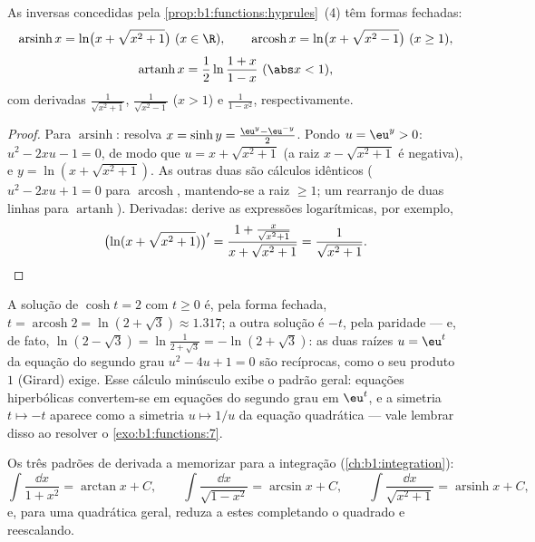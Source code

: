\begin{proposition}\label{prop:b1:functions:invhyp}
As inversas concedidas pela \cref{prop:b1:functions:hyprules}~(4) têm
formas fechadas:
\[
\operatorname{arsinh} x = \ln\bigl(x + \sqrt{x^2 + 1}\bigr)
\ (x \in \R),
\qquad
\operatorname{arcosh} x = \ln\bigl(x + \sqrt{x^2 - 1}\bigr)
\ (x \geq 1),
\]
\[
\operatorname{artanh} x = \frac 12 \ln\frac{1 + x}{1 - x}
\ (\abs x < 1),
\]
com derivadas $\frac{1}{\sqrt{x^2+1}}$, $\frac{1}{\sqrt{x^2-1}}$
($x > 1$) e $\frac{1}{1 - x^2}$, respectivamente.
\end{proposition}

\begin{proof}
Para $\operatorname{arsinh}$: resolva $x = \sinh y = \frac{\eu^y -
\eu^{-y}}{2}$. Pondo $u = \eu^y > 0$: $u^2 - 2xu - 1 = 0$, de modo que $u = x
+ \sqrt{x^2 + 1}$ (a raiz $x - \sqrt{x^2+1}$ é negativa), e $y =
\ln(x + \sqrt{x^2+1})$. As outras duas são cálculos idênticos
($u^2 - 2xu + 1 = 0$ para $\operatorname{arcosh}$, mantendo-se a raiz
$\geq 1$; um rearranjo de duas linhas para $\operatorname{artanh}$).
Derivadas: derive as expressões logarítmicas, por exemplo,
\[
\bigl(\ln(x + \sqrt{x^2+1})\bigr)'
= \frac{1 + \frac{x}{\sqrt{x^2+1}}}{x + \sqrt{x^2+1}}
= \frac{1}{\sqrt{x^2 + 1}} . \qedhere
\]
\end{proof}

\begin{example}\label{ex:b1:functions:arcoshtwo}
A solução de $\cosh t = 2$ com $t \geq 0$ é, pela forma
fechada, $t = \operatorname{arcosh} 2 = \ln(2 + \sqrt3) \approx
1.317$; a outra solução é $-t$, pela paridade --- e, de fato,
$\ln(2 - \sqrt3) = \ln\frac1{2 + \sqrt3} = -\ln(2 + \sqrt3)$: as
duas raízes $u = \eu^t$ da equação do segundo grau $u^2 - 4u + 1 = 0$ são
recíprocas, como o seu produto $1$ (Girard) exige. Esse cálculo
minúsculo exibe o padrão geral: equações hiperbólicas
convertem-se em equações do segundo grau em $\eu^t$, e a simetria $t \mapsto -t$
aparece como a simetria $u \mapsto 1/u$ da equação quadrática ---
vale lembrar disso ao resolver o \cref{exo:b1:functions:7}.
\end{example}

\begin{method}\label{met:b1:functions:primitive}
Os três padrões de derivada a memorizar para a integração
(\cref{ch:b1:integration}):
\[
\int \frac{\dd x}{1 + x^2} = \arctan x + C,
\qquad
\int \frac{\dd x}{\sqrt{1 - x^2}} = \arcsin x + C,
\qquad
\int \frac{\dd x}{\sqrt{x^2 + 1}} = \operatorname{arsinh} x + C,
\]
e, para uma quadrática geral, reduza a estes completando o quadrado
e reescalando.
\end{method}

